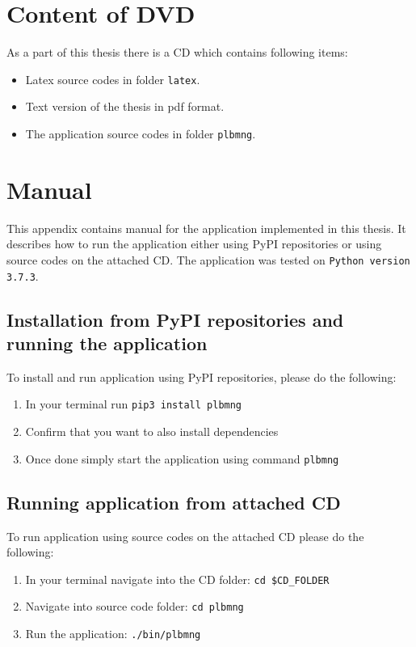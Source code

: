 \chapter{Content of DVD}
As a part of this thesis there is a CD which contains following items:
\begin{itemize}
	\item Latex source codes in folder \texttt{latex}.
	\item Text version of the thesis in pdf format.
	\item The application source codes in folder \texttt{plbmng}.
\end{itemize}

\chapter{Manual}
This appendix contains manual for the application implemented in this thesis. It describes how to run the application either using PyPI repositories or using source codes on the attached CD. The application was tested on \texttt{Python version 3.7.3}.
\section{Installation from PyPI repositories and running the application}
To install and run application using PyPI repositories, please do the following:\\
\begin{enumerate}
	\item In your terminal run \texttt{pip3 install plbmng}
	\item Confirm that you want to also install dependencies
	\item Once done simply start the application using command \texttt{plbmng}
\end{enumerate}

\section{Running application from attached CD}
To run application using source codes on the attached CD please do the following:\\
\begin{enumerate}
	\item In your terminal navigate into the CD folder: \texttt{cd \$CD\_FOLDER}
	\item Navigate into source code folder: \texttt{cd plbmng}
	\item Run the application: \texttt{./bin/plbmng}
\end{enumerate}